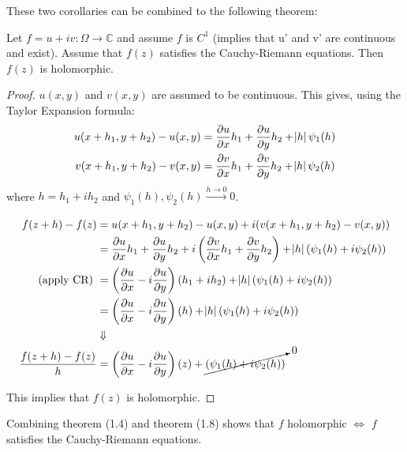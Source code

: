 These two corollaries can be combined to the following theorem:

\begin{theorem}
Let $f=u+iv:\Omega \xrightarrow{} \mathbb{C}$ and assume $f$ is $C^1$ (implies that u' and v' are continuous and exist). Assume that $f(z)$ satisfies the Cauchy-Riemann equations. Then $f(z)$ is holomorphic.
\end{theorem}

\begin{proof}
$u(x,y)$ and $v(x,y)$ are assumed to be continuous. This gives, using the Taylor Expansion formula:
\begin{align*}
    u(x+h_1,y+h_2) - u(x,y) &= \frac{\partial u}{\partial x}h_1 + \frac{\partial u}{\partial y}h_2 +\abs{h}\psi_1(h)\\
    v(x+h_1,y+h_2) - v(x,y) &= \frac{\partial v}{\partial x}h_1 + \frac{\partial v}{\partial y}h_2 +\abs{h}\psi_2(h)
\end{align*}
where $h=h_1+ih_2$ and $\psi_1(h),\psi_2(h) \xrightarrow[]{h \to 0} 0$.

\begin{align*}
    f(z+h)-f(z) &= u(x+h_1,y+h_2) - u(x,y) +i(v(x+h_1,y+h_2) - v(x,y))\\
    &= \frac{\partial u}{\partial x}h_1 + \frac{\partial u}{\partial y}h_2 + i\left(\frac{\partial v}{\partial x}h_1 + \frac{\partial v}{\partial y}h_2\right) + \abs{h}(\psi_1(h)+i\psi_2(h))\\
    \text{(apply CR) } &= \left( \frac{\partial u}{\partial x} -i\frac{\partial u}{\partial y}\right)(h_1+ih_2)+\abs{h}(\psi_1(h)+i\psi_2(h))\\&= \left( \frac{\partial u}{\partial x} -i\frac{\partial u}{\partial y}\right)(h)+\abs{h}(\psi_1(h)+i\psi_2(h))\\
    &\Downarrow\\
    \frac{f(z+h)-f(z)}{h}& = \left(\frac{\partial u}{\partial x} -i\frac{\partial u}{\partial y}  \right)(z) + \cancelto{0}{(\psi_1(h)+i\psi_2(h))}
\end{align*}

This implies that $f(z)$ is holomorphic.
\end{proof}

\begin{remark}
Combining theorem (1.4) and theorem (1.8) shows that $f$ holomorphic $\iff$ $f$ satisfies the Cauchy-Riemann equations.
\end{remark}


